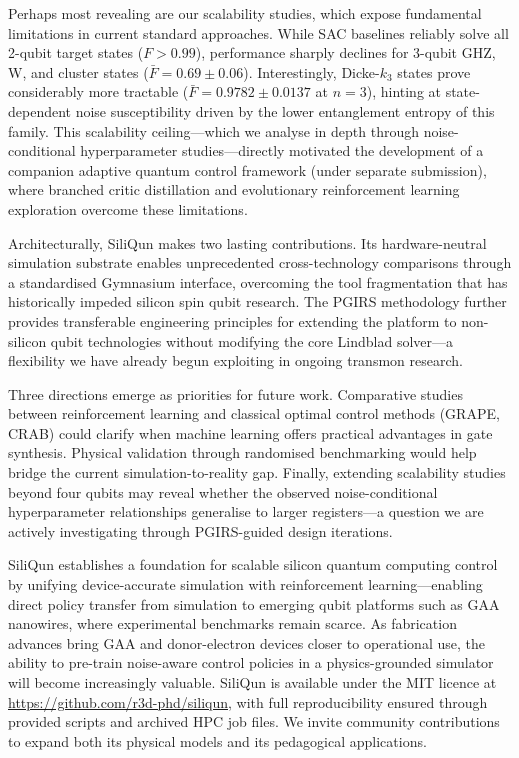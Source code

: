 Perhaps most revealing are our scalability studies, which expose fundamental limitations in current standard approaches. While SAC baselines reliably solve all 2-qubit target states ($F > 0.99$), performance sharply declines for 3-qubit GHZ, W, and cluster states ($\bar{F} = 0.69 \pm 0.06$). Interestingly, Dicke-$k_3$ states prove considerably more tractable ($\bar{F} = 0.9782 \pm 0.0137$ at $n=3$), hinting at state-dependent noise susceptibility driven by the lower entanglement entropy of this family. This scalability ceiling---which we analyse in depth through noise-conditional hyperparameter studies---directly motivated the development of a companion adaptive quantum control framework (under separate submission), where branched critic distillation and evolutionary reinforcement learning exploration overcome these limitations.

Architecturally, SiliQun makes two lasting contributions. Its hardware-neutral simulation substrate enables unprecedented cross-technology comparisons through a standardised Gymnasium interface, overcoming the tool fragmentation that has historically impeded silicon spin qubit research. The PGIRS methodology further provides transferable engineering principles for extending the platform to non-silicon qubit technologies without modifying the core Lindblad solver---a flexibility we have already begun exploiting in ongoing transmon research.

Three directions emerge as priorities for future work. Comparative studies between reinforcement learning and classical optimal control methods (GRAPE, CRAB) could clarify when machine learning offers practical advantages in gate synthesis. Physical validation through randomised benchmarking would help bridge the current simulation-to-reality gap. Finally, extending scalability studies beyond four qubits may reveal whether the observed noise-conditional hyperparameter relationships generalise to larger registers---a question we are actively investigating through PGIRS-guided design iterations.

SiliQun establishes a foundation for scalable silicon quantum computing control by unifying device-accurate simulation with reinforcement learning—enabling direct policy transfer from simulation to emerging qubit platforms such as GAA nanowires, where experimental benchmarks remain scarce. As fabrication advances bring GAA and donor-electron devices closer to operational use, the ability to pre-train noise-aware control policies in a physics-grounded simulator will become increasingly valuable. SiliQun is available under the MIT licence at \url{https://github.com/r3d-phd/siliqun}, with full reproducibility ensured through provided scripts and archived HPC job files. We invite community contributions to expand both its physical models and its pedagogical applications.
